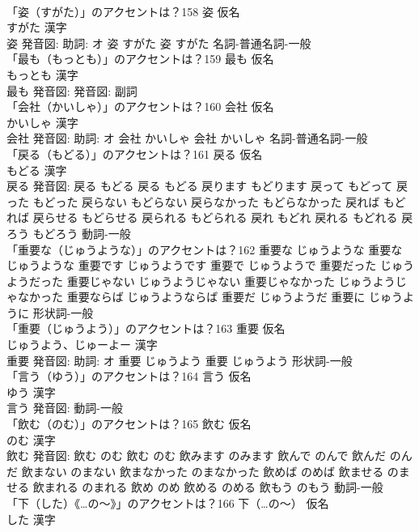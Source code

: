 \documentclass[8pt]{extreport}
\begin{document}
\begin{CJK}{UTF8}{min}
\\	「姿（すがた）」のアクセントは？158	姿 仮名　
\\	すがた 漢字　
\\	姿 発音図: 助詞: オ	姿 すがた		姿 すがた				名詞-普通名詞-一般 
\\	「最も（もっとも）」のアクセントは？159	最も 仮名　
\\	もっとも 漢字　
\\	最も 発音図: 発音図:							副詞 
\\	「会社（かいしゃ）」のアクセントは？160	会社 仮名　
\\	かいしゃ 漢字　
\\	会社 発音図: 助詞: オ	会社 かいしゃ		会社 かいしゃ				名詞-普通名詞-一般 
\\	「戻る（もどる）」のアクセントは？161	戻る 仮名　
\\	もどる 漢字　
\\	戻る 発音図:	戻る もどる		戻る もどる 戻ります もどります 戻って もどって 戻った もどった 戻らない もどらない 戻らなかった もどらなかった 戻れば もどれば 戻らせる もどらせる 戻られる もどられる 戻れ もどれ 戻れる もどれる 戻ろう もどろう				動詞-一般 
\\	「重要な（じゅうような）」のアクセントは？162		重要な じゅうような		重要な じゅうような 重要です じゅうようです 重要で じゅうようで 重要だった じゅうようだった 重要じゃない じゅうようじゃない 重要じゃなかった じゅうようじゃなかった 重要ならば じゅうようならば 重要だ じゅうようだ 重要に じゅうように				形状詞-一般 
\\	「重要（じゅうよう）」のアクセントは？163	重要 仮名　
\\	じゅうよう、じゅーよー 漢字　
\\	重要 発音図: 助詞: オ	重要 じゅうよう		重要 じゅうよう				形状詞-一般 
\\	「言う（ゆう）」のアクセントは？164	言う 仮名　
\\	ゆう 漢字　
\\	言う 発音図:							動詞-一般 
\\	「飲む（のむ）」のアクセントは？165	飲む 仮名　
\\	のむ 漢字　
\\	飲む 発音図:	飲む のむ		飲む のむ 飲みます のみます 飲んで のんで 飲んだ のんだ 飲まない のまない 飲まなかった のまなかった 飲めば のめば 飲ませる のませる 飲まれる のまれる 飲め のめ 飲める のめる 飲もう のもう				動詞-一般 
\\	「下（した）《…の〜》」のアクセントは？166	下（…の〜） 仮名　
\\	した 漢字　

\end{CJK}
\end{document}
